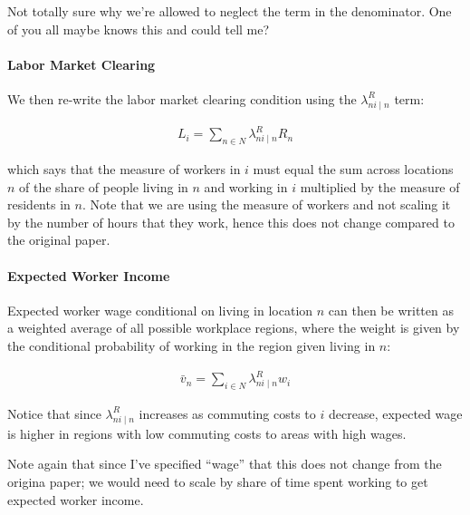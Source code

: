\documentclass[10pt]{article}
\begin{document}
\begin{questions}
    Not totally sure why we're allowed to neglect the term in the denominator.
    One of you all maybe knows this and could tell me?
\end{questions}

\paragraph{Labor Market Clearing}

We then re-write the labor market clearing condition
using the $\lambda_{n i \mid n}^R$ term:

\begin{align}
    L_i=\sum_{n \in N} \lambda_{n i \mid n}^R R_n
\end{align}

which says that the 
measure of workers in $i$
must equal the sum across locations $n$ of 
the share of people living in $n$ 
and working in $i$ multiplied by
the measure of residents in $n$. Note that we are using 
the measure of workers and not scaling it by the number of 
hours that they work, hence this does not change 
compared to the original paper.

\paragraph{Expected Worker Income}

Expected worker wage
conditional on living in location $n$ 
can then be written as a weighted 
average of all possible workplace regions,
where the weight is given by the conditional probability 
of working in the region given living in $n$:

\begin{align}
    \bar{v}_n=\sum_{i \in N} \lambda_{n i \mid n}^R w_i \label{eq:expected_worker_income}
\end{align}

Notice that since $\lambda_{n i \mid n}^R$ increases 
as commuting costs to $i$ decrease, expected 
wage is higher in regions with 
low commuting costs to areas with high wages.

Note again that since I've specified ``wage'' that this 
does not change from the origina paper; we would need 
to scale by share of time spent working to get 
expected worker income.
\end{document}
